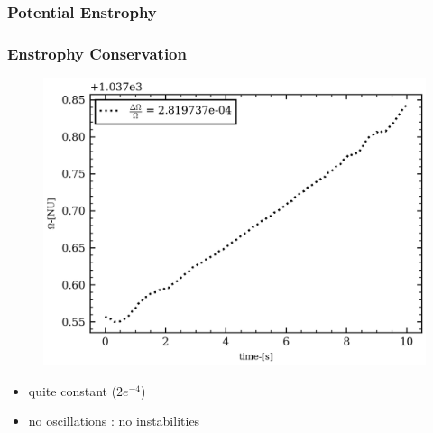\documentclass[numbering=fraction]{beamer}
\begin{document}
\subsubsection{Potential Enstrophy}
\begin{frame}
    \frametitle{Enstrophy Conservation}
    \begin{minipage}{.6\linewidth}

        \begin{figure}[H]
            \centering
            \includegraphics[width=1\linewidth]{./figure/potential_enstrophy_kelvin_wave.png}
        \end{figure}
    \end{minipage}
    \begin{minipage}{.38\linewidth}

        \begin{itemize}
            \item quite constant ($2e^{-4}$)
            \item no oscillations : no instabilities

        \end{itemize}
    \end{minipage}
\end{frame}
\end{document}
